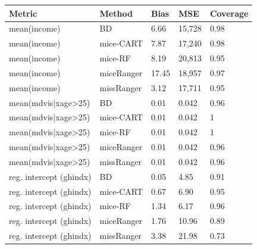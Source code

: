 \documentclass[20pt,margin=1in,innermargin=-4.5in,blockverticalspace=-0.25in]{tikzposter}
\begin{document}
\begin{columns}
{        \begin{center}
            \vspace{-0.5em}
            \begin{tabular}{|l|l|lll|}
             \hline   
             Metric &  Method & Bias \hspace{10mm} & MSE \hspace{5mm} & Coverage\\
             \hline
             mean(income) & BD & 6.66  & 15,728 & 0.98\\
             mean(income) & mice-CART & 7.87 & 17,240 & 0.98\\
             mean(income) & mice-RF & 8.19 & 20,813 & 0.95\\
             mean(income) & miceRanger & 17.45 & 18,957 & 0.97\\
             mean(income) & missRanger  & 3.12 & 17,711 & 0.95 \\
             \hline
             mean(mdvis|xage>25) & BD & 0.01 & 0.042 & 0.96\\
             mean(mdvis|xage>25) & mice-CART & 0.01 & 0.042 & 1\\
             mean(mdvis|xage>25) & mice-RF & 0.01 & 0.042 & 1\\
             mean(mdvis|xage>25) & miceRanger & 0.01 & 0.042 & 0.96\\
             mean(mdvis|xage>25) & missRanger  & 0.01 & 0.042 & 0.96\\
             \hline
             reg. intercept (ghindx) & BD & 0.05 & 4.85 & 0.91\\
             reg. intercept (ghindx) & mice-CART & 0.67 & 6.90 & 0.95\\
             reg. intercept (ghindx) & mice-RF & 1.34 & 6.17 & 0.96\\
             reg. intercept (ghindx) & miceRanger & 1.76 & 10.96 & 0.89\\
             reg. intercept (ghindx) & missRanger  & 3.38 & 21.98 & 0.73\\
             \hline
        \end{tabular}
        \end{center}
    }


        \block{}{
        \vspace{-2.5em}
        
}
\end{columns}
\end{document}
